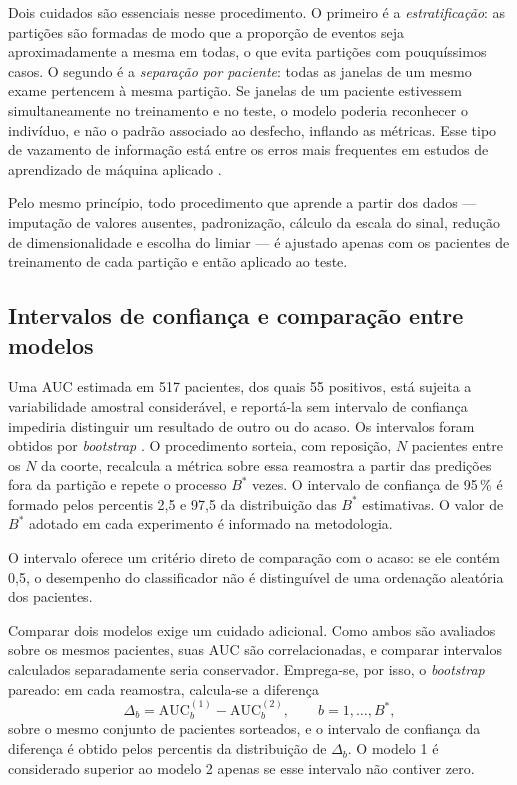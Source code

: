 Dois cuidados são essenciais nesse procedimento. O primeiro é a
\textit{estratificação}: as partições são formadas de modo que a proporção de
eventos seja aproximadamente a mesma em todas, o que evita partições com
pouquíssimos casos. O segundo é a \textit{separação por paciente}: todas as
janelas de um mesmo exame pertencem à mesma partição. Se janelas de um
paciente estivessem simultaneamente no treinamento e no teste, o modelo
poderia reconhecer o indivíduo, e não o padrão associado ao desfecho,
inflando as métricas. Esse tipo de vazamento de informação está entre os
erros mais frequentes em estudos de aprendizado de máquina aplicado
\cite{kapoor2023leakage}.

Pelo mesmo princípio, todo procedimento que aprende a partir dos dados ---
imputação de valores ausentes, padronização, cálculo da escala do sinal,
redução de dimensionalidade e escolha do limiar --- é ajustado apenas com os
pacientes de treinamento de cada partição e então aplicado ao teste.

\subsection{Intervalos de confiança e comparação entre modelos}
\label{subsec:fund-bootstrap}

Uma \gls{AUC} estimada em 517 pacientes, dos quais 55 positivos, está sujeita
a variabilidade amostral considerável, e reportá-la sem intervalo de
confiança impediria distinguir um resultado de outro ou do acaso. Os
intervalos foram obtidos por \textit{bootstrap} \cite{efron1993introduction}.
O procedimento sorteia, com reposição, $N$ pacientes entre os $N$ da coorte,
recalcula a métrica sobre essa reamostra a partir das predições fora da
partição e repete o processo $B^{*}$ vezes. O intervalo de confiança de 95\,\%
é formado pelos percentis 2,5 e 97,5 da distribuição das $B^{*}$ estimativas.
O valor de $B^{*}$ adotado em cada experimento é informado na metodologia.

O intervalo oferece um critério direto de comparação com o acaso: se ele
contém 0,5, o desempenho do classificador não é distinguível de uma
ordenação aleatória dos pacientes.

Comparar dois modelos exige um cuidado adicional. Como ambos são avaliados
sobre os mesmos pacientes, suas \gls{AUC} são correlacionadas, e comparar
intervalos calculados separadamente seria conservador. Emprega-se, por isso,
o \textit{bootstrap} pareado: em cada reamostra, calcula-se a diferença
\begin{equation}
	\Delta_b = \mathrm{AUC}_b^{(1)} - \mathrm{AUC}_b^{(2)}, \qquad b = 1, \dots, B^{*},
	\label{eq:delta-auc}
\end{equation}
\noindent
sobre o mesmo conjunto de pacientes sorteados, e o intervalo de confiança da
diferença é obtido pelos percentis da distribuição de $\Delta_b$. O modelo
1 é considerado superior ao modelo 2 apenas se esse intervalo não contiver zero.

